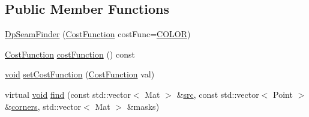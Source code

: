 \subsection*{Public Member Functions}
\begin{DoxyCompactItemize}
\item 
\hyperlink{classcv_1_1detail_1_1DpSeamFinder_a1ab92a71baf2444abf8129e3bddc7151}{Dp\-Seam\-Finder} (\hyperlink{classcv_1_1detail_1_1DpSeamFinder_a6ce104a17b48a0503ccdcf4787ba2ef3}{Cost\-Function} cost\-Func=\hyperlink{classcv_1_1detail_1_1DpSeamFinder_a6ce104a17b48a0503ccdcf4787ba2ef3aa9485acd73bb7982e3b2d853d6b12947}{C\-O\-L\-O\-R})
\item 
\hyperlink{classcv_1_1detail_1_1DpSeamFinder_a6ce104a17b48a0503ccdcf4787ba2ef3}{Cost\-Function} \hyperlink{classcv_1_1detail_1_1DpSeamFinder_ad5ef6bd37f383493a93f00c9bd18e5a0}{cost\-Function} () const 
\item 
\hyperlink{legacy_8hpp_a8bb47f092d473522721002c86c13b94e}{void} \hyperlink{classcv_1_1detail_1_1DpSeamFinder_a03aed0908c6b514c37ed3f00c0b057dd}{set\-Cost\-Function} (\hyperlink{classcv_1_1detail_1_1DpSeamFinder_a6ce104a17b48a0503ccdcf4787ba2ef3}{Cost\-Function} val)
\item 
virtual \hyperlink{legacy_8hpp_a8bb47f092d473522721002c86c13b94e}{void} \hyperlink{classcv_1_1detail_1_1DpSeamFinder_a794aa2be59118bade4f09bedbeb0ec9b}{find} (const std\-::vector$<$ Mat $>$ \&\hyperlink{legacy_8hpp_a371cd109b74033bc4366f584edd3dacc}{src}, const std\-::vector$<$ Point $>$ \&\hyperlink{imgproc__c_8h_a223e965e192c7025d6c6be77305f515b}{corners}, std\-::vector$<$ Mat $>$ \&masks)
\end{DoxyCompactItemize}


